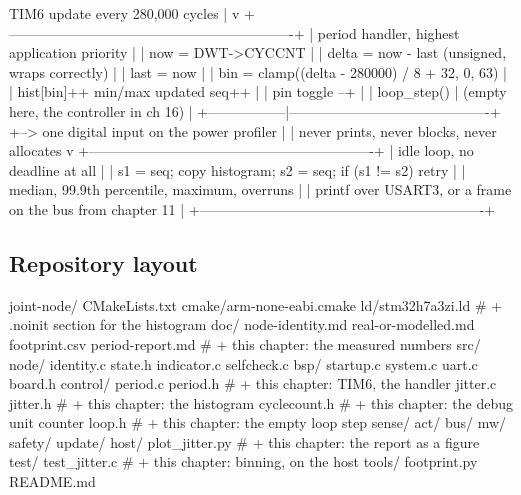 \begin{asciiart}
  TIM6 update every 280,000 cycles
        |
        v
  +-------------------------------------------------------------+
  | period handler, highest application priority                 |
  |   now   = DWT->CYCCNT                                        |
  |   delta = now - last          (unsigned, wraps correctly)    |
  |   last  = now                                                |
  |   bin   = clamp((delta - 280000) / 8 + 32, 0, 63)            |
  |   hist[bin]++          min/max updated          seq++        |
  |   pin toggle  --+                                            |
  |   loop_step()   |      (empty here, the controller in ch 16) |
  +-----------------|-------------------------------------------+
                    +--> one digital input on the power profiler
        |
        | never prints, never blocks, never allocates
        v
  +-------------------------------------------------------------+
  | idle loop, no deadline at all                                |
  |   s1 = seq; copy histogram; s2 = seq; if (s1 != s2) retry    |
  |   median, 99.9th percentile, maximum, overruns               |
  |   printf over USART3, or a frame on the bus from chapter 11  |
  +-------------------------------------------------------------+
\end{asciiart}

\subsection*{Repository layout}

\begin{plaincode}
joint-node/
  CMakeLists.txt
  cmake/arm-none-eabi.cmake
  ld/stm32h7a3zi.ld                   # + .noinit section for the histogram
  doc/
    node-identity.md  real-or-modelled.md  footprint.csv
    period-report.md                  # + this chapter: the measured numbers
  src/
    node/    identity.c state.h indicator.c selfcheck.c
    bsp/     startup.c system.c uart.c board.h
    control/
      period.c  period.h              # + this chapter: TIM6, the handler
      jitter.c  jitter.h              # + this chapter: the histogram
      cyclecount.h                    # + this chapter: the debug unit counter
      loop.h                          # + this chapter: the empty loop step
    sense/  act/  bus/  mw/  safety/  update/
  host/
    plot_jitter.py                    # + this chapter: the report as a figure
  test/
    test_jitter.c                     # + this chapter: binning, on the host
  tools/  footprint.py
  README.md
\end{plaincode}

